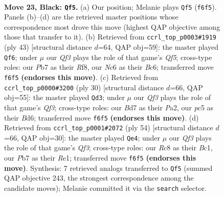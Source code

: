 \documentclass[11pt]{article}
\begin{document}
\clearpage

\begin{figure}[p]\centering
\begin{subfigure}{0.46\textwidth}\centering
\resizebox{\linewidth}{!}{%
\newchessgame
\chessboard[
  setfen={1rr3k1/1p1b1ppp/2n1pq2/2Pp3P/p2P4/P1P2N2/R2QBPP1/2R2K2 b - - 4 23},
  showmover=false,
  pgfstyle=straightmove, color=movearrow, markmove={f6-f5}
]}
\caption{}
\end{subfigure}\hfill
\begin{subfigure}{0.46\textwidth}\centering
\resizebox{\linewidth}{!}{%
\newchessgame
\chessboard[
  setfen={1r3r2/1p3pk1/2bpn1p1/4p2p/p1P1Pq1P/3B1P2/PPN3P1/1K1RQ2R b - - 7 22},
  showmover=false,
  pgfstyle=straightmove, color=movearrow, markmove={f4-f6}
]}
\caption{}
\end{subfigure}
\\[4pt]
\begin{subfigure}{0.46\textwidth}\centering
\resizebox{\linewidth}{!}{%
\newchessgame
\chessboard[
  setfen={r2qr1k1/p2n1ppp/2pBpb2/2Pp4/1P1P4/2N2Q2/P4PPP/1R3RK1 w - - 1 16},
  showmover=false,
  pgfstyle=straightmove, color=movearrow, markmove={f3-d3}
]}
\caption{}
\end{subfigure}\hfill
\begin{subfigure}{0.46\textwidth}\centering
\resizebox{\linewidth}{!}{%
\newchessgame
\chessboard[
  setfen={4rbk1/p2r1q2/P1p1npp1/2p1p2p/7P/2PPNQ2/1P3PP1/2BRR1K1 w - - 3 28},
  showmover=false,
  pgfstyle=straightmove, color=movearrow, markmove={f3-e4}
]}
\caption{}
\end{subfigure}
\caption{\textbf{Move 23, Black: \texttt{Qf5}.} (a) Our position; Melanie plays \texttt{Qf5} (\texttt{f6f5}). Panels (b)--(d) are the retrieved master positions whose correspondence most drove this move (highest QAP objective among those that transfer to it). (b) Retrieved from \texttt{ccrl\_top\_p0003\#1919} (ply 43) [structural distance $d$=64, QAP obj=59]: the master played \texttt{Qf6}; under $\mu$ our \emph{Qf3} plays the role of that game's \emph{Qf5}; cross-type roles: our \emph{P}b7 as their \emph{R}f8, our \emph{N}c6 as their \emph{B}c6; transferred move \texttt{f6f5} \textbf{(endorses this move)}. (c) Retrieved from \texttt{ccrl\_top\_p0000\#3200} (ply 30) [structural distance $d$=66, QAP obj=55]: the master played \texttt{Qd3}; under $\mu$ our \emph{Qf3} plays the role of that game's \emph{Qf3}; cross-type roles: our \emph{B}d7 as their \emph{P}a2, our \emph{p}c5 as their \emph{B}d6; transferred move \texttt{f6f5} \textbf{(endorses this move)}. (d) Retrieved from \texttt{ccrl\_top\_p0001\#2072} (ply 54) [structural distance $d$=66, QAP obj=30]: the master played \texttt{Qe4}; under $\mu$ our \emph{Qf3} plays the role of that game's \emph{Qf3}; cross-type roles: our \emph{R}c8 as their \emph{B}c1, our \emph{P}b7 as their \emph{R}e1; transferred move \texttt{f6f5} \textbf{(endorses this move)}. Synthesis: 7 retrieved analogs transferred to \texttt{Qf5} (summed QAP objective 243, the strongest correspondence among the candidate moves); Melanie committed it via the \texttt{search} selector.}
\label{fig:thought-m45}
\end{figure}
\end{document}
